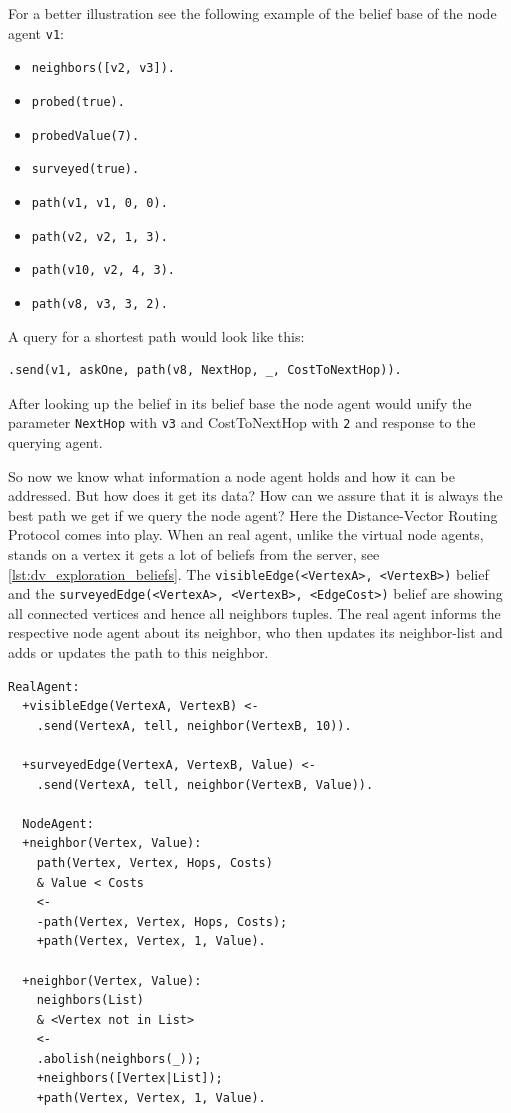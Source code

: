 \begin{samepage}
For a better illustration see the following example of the belief base of the node agent \texttt{v1}:
\begin{itemize}
  \item \texttt{neighbors([v2, v3]).}
  \item \texttt{probed(true).}
  \item \texttt{probedValue(7).}
  \item \texttt{surveyed(true).}
  \item \texttt{path(v1, v1, 0, 0).}
  \item \texttt{path(v2, v2, 1, 3).}
  \item \texttt{path(v10, v2, 4, 3).}
  \item \texttt{path(v8, v3, 3, 2).}
\end{itemize}
\end{samepage}

A query for a shortest path would look like this:
\begin{lstlisting}[caption={Query for shortest path from \texttt{v1} to \texttt{v8}}, label={lst:dv_shortestPath_query}]
  .send(v1, askOne, path(v8, NextHop, _, CostToNextHop)).
\end{lstlisting}
After looking up the belief in its belief base the node agent would unify the parameter \texttt{NextHop} with \texttt{v3} and CostToNextHop with \texttt{2} and response to the querying agent.

So now we know what information a node agent holds and how it can be addressed. But how does it get its data? How can we assure that it is always the best path we get if we query the node agent? Here the Distance-Vector Routing Protocol comes into play. When an real agent, unlike the virtual node agents, stands on a vertex it gets a lot of beliefs from the server, see \autoref{lst:dv_exploration_beliefs}. The \texttt{visibleEdge(<VertexA>, <VertexB>)} belief and the \texttt{surveyedEdge(<VertexA>, <VertexB>, <EdgeCost>)} belief are showing all connected vertices and hence all neighbors tuples. The real agent informs the respective node agent about its neighbor, who then updates its neighbor-list and adds or updates the path to this neighbor.

\begin{lstlisting}[caption={Real agent informs node agent about its neighbor}, label={lst:dv_neighbor_inform}]
  RealAgent: 
  +visibleEdge(VertexA, VertexB) <- 
    .send(VertexA, tell, neighbor(VertexB, 10)).
  
  +surveyedEdge(VertexA, VertexB, Value) <- 
    .send(VertexA, tell, neighbor(VertexB, Value)).
    
  NodeAgent:
  +neighbor(Vertex, Value):
    path(Vertex, Vertex, Hops, Costs)
    & Value < Costs
    <- 
    -path(Vertex, Vertex, Hops, Costs);
    +path(Vertex, Vertex, 1, Value).
        
  +neighbor(Vertex, Value):
    neighbors(List)
    & <Vertex not in List>
    <-
    .abolish(neighbors(_)); 
    +neighbors([Vertex|List]);
    +path(Vertex, Vertex, 1, Value).  
\end{lstlisting}

